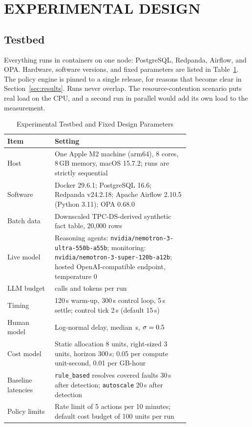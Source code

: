\section{EXPERIMENTAL DESIGN}\label{sec:method}

\subsection{Testbed}
Everything runs in containers on one node: PostgreSQL, Redpanda, Airflow, and OPA. Hardware, software
versions, and fixed parameters are listed in Table~\ref{tab:testbed}. The policy engine is pinned to a
single release, for reasons that become clear in Section~\ref{sec:results}. Runs never overlap. The
resource-contention scenario puts real load on the CPU, and a second run in parallel would add its own
load to the measurement.

\begin{table}[t]
\centering
\caption{Experimental Testbed and Fixed Design Parameters}
\label{tab:testbed}
\small
\begin{tabular}{@{}lp{0.74\linewidth}@{}}
\toprule
Item & Setting \\
\midrule
Host & One Apple M2 machine (arm64), 8 cores, 8\,GB memory, macOS 15.7.2; runs are strictly sequential \\
Software & Docker 29.6.1; PostgreSQL 16.6; Redpanda v24.2.18; Apache Airflow 2.10.5 (Python 3.11); OPA 0.68.0 \\
Batch data & Downscaled TPC-DS-derived synthetic fact table, 20{,}000 rows \\
Live model & Reasoning agents: \texttt{nvidia/nemotron-3-ultra-550b-a55b}; monitoring: \texttt{nvidia/nemotron-3-super-120b-a12b}; hosted OpenAI-compatible endpoint, temperature 0 \\
LLM budget & \NBudgetCalls{} calls and \NBudgetTokens{} tokens per run \\
Timing & 120\,s warm-up, 300\,s control loop, 5\,s settle; control tick 2\,s (default 15\,s) \\
Human model & Log-normal delay, median \NHumanMedian{}\,s, $\sigma=0.5{}$ \\
Cost model & Static allocation 8 units, right-sized 3 units, horizon 300\,s; 0.05 per compute unit-second, 0.01 per GB-hour \\
Baseline latencies & \texttt{rule\_based} resolves covered faults 30\,s after detection; \texttt{autoscale} 20\,s after detection \\
Policy limits & Rate limit of 5 actions per 10 minutes; default cost budget of 100 units per run \\
\bottomrule
\end{tabular}
\end{table}

